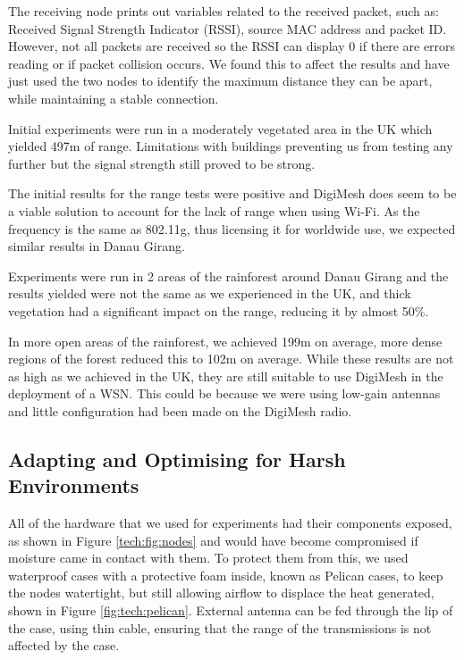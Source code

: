 The receiving node prints out variables related to the received packet, such as: Received Signal Strength Indicator (RSSI), source MAC address and packet ID. However, not all packets are received so the RSSI can display 0 if there are errors reading or if packet collision occurs. We found this to affect the results and have just used the two nodes to identify the maximum distance they can be apart, while maintaining a stable connection.
					
Initial experiments were run in a moderately vegetated area in the UK which yielded 497m of range. Limitations with buildings preventing us from testing any further but the signal strength still proved to be strong.
			
The initial results for the range tests were positive and DigiMesh does seem to be a viable solution to account for the lack of range when using Wi-Fi. As the frequency is the same as 802.11g, thus licensing it for worldwide use, we expected similar results in Danau Girang.
						
Experiments were run in 2 areas of the rainforest around Danau Girang and the results yielded were not the same as we experienced in the UK, and thick vegetation had a significant impact on the range, reducing it by almost 50\%.
			
In more open areas of the rainforest, we achieved 199m on average, more dense regions of the forest reduced this to 102m on average. While these results are not as high as we achieved in the UK, they are still suitable to use DigiMesh in the deployment of a WSN. This could be because we were using low-gain antennas and little configuration had been made on the DigiMesh radio.

\subsection{Adapting and Optimising for Harsh Environments}
	All of the hardware that we used for experiments had their components exposed, as shown in Figure \ref{tech:fig:nodes} and would have become compromised if moisture came in contact with them. To protect them from this, we used waterproof cases with a protective foam inside, known as Pelican cases, to keep the nodes watertight, but still allowing airflow to displace the heat generated, shown in Figure \ref{fig:tech:pelican}.
	External antenna can be fed through the lip of the case, using thin cable, ensuring that the range of the transmissions is not affected by the case. 

